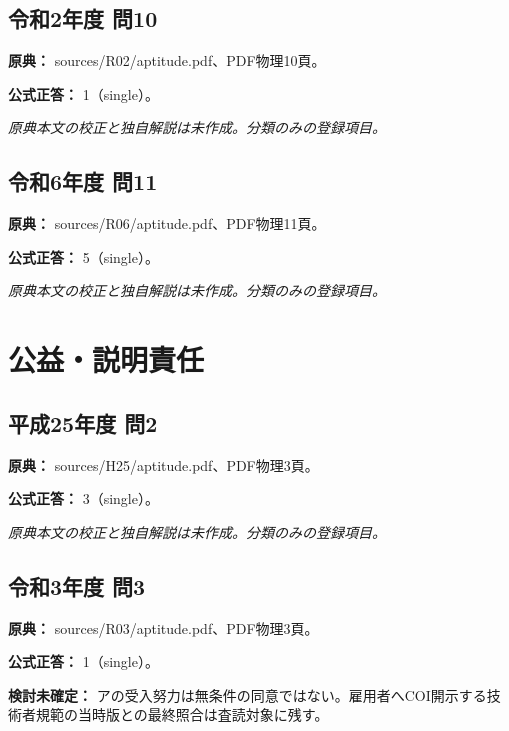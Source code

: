 \subsection{令和2年度 問10}
\label{q:r02-reg-apt-10}

\noindent\textbf{原典：} sources/R02/aptitude.pdf、PDF物理10頁。

\textbf{公式正答：} 1（single）。

\par\textit{原典本文の校正と独自解説は未作成。分類のみの登録項目。}

\subsection{令和6年度 問11}
\label{q:r06-reg-apt-11}

\noindent\textbf{原典：} sources/R06/aptitude.pdf、PDF物理11頁。

\textbf{公式正答：} 5（single）。

\par\textit{原典本文の校正と独自解説は未作成。分類のみの登録項目。}

\section{公益・説明責任}

\subsection{平成25年度 問2}
\label{q:h25-reg-apt-02}

\noindent\textbf{原典：} sources/H25/aptitude.pdf、PDF物理3頁。

\textbf{公式正答：} 3（single）。

\par\textit{原典本文の校正と独自解説は未作成。分類のみの登録項目。}

\subsection{令和3年度 問3}
\label{q:r03-reg-apt-03}

\noindent\textbf{原典：} sources/R03/aptitude.pdf、PDF物理3頁。

\textbf{公式正答：} 1（single）。

\par\textbf{検討未確定：} アの受入努力は無条件の同意ではない。雇用者へCOI開示する技術者規範の当時版との最終照合は査読対象に残す。

